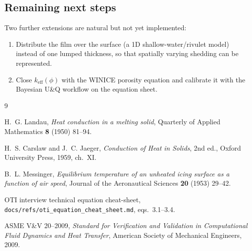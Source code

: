 \documentclass[11pt,a4paper]{article}
\newcommand{\keff}{k_{\mathrm{eff}}}
\begin{document}
\subsection*{Remaining next steps}

Two further extensions are natural but not yet implemented:
\begin{enumerate}[leftmargin=1.5em,itemsep=2pt]
  \item Distribute the film over the surface (a 1D shallow-water/rivulet model) instead of
        one lumped thickness, so that spatially varying shedding can be represented.
  \item Close $\keff(\phi)$ with the WINICE porosity equation and calibrate it with the
        Bayesian U\&Q workflow on the equation sheet.
\end{enumerate}

\begin{thebibliography}{9}

H.~G. Landau,
\emph{Heat conduction in a melting solid},
Quarterly of Applied Mathematics \textbf{8} (1950) 81--94.

H.~S. Carslaw and J.~C. Jaeger,
\emph{Conduction of Heat in Solids}, 2nd ed.,
Oxford University Press, 1959, ch.~XI.

B.~L. Messinger,
\emph{Equilibrium temperature of an unheated icing surface as a function of air speed},
Journal of the Aeronautical Sciences \textbf{20} (1953) 29--42.

OTI interview technical equation cheat-sheet,
\texttt{docs/refs/oti\_equation\_cheat\_sheet.md}, eqs.~3.1--3.4.

ASME V\&V 20--2009,
\emph{Standard for Verification and Validation in Computational Fluid Dynamics and Heat
Transfer}, American Society of Mechanical Engineers, 2009.

\end{thebibliography}
\end{document}
